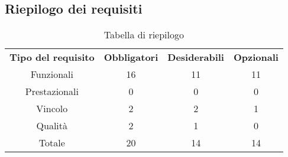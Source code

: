 \subsection{Riepilogo dei requisiti}
\begin{table}[h]
\centering
\begin{tabular}{| c | c | c | c |}
		\rowcolor{LightBlue}
		\color{white}\bfseries Tipo del requisito & \color{white}\bfseries Obbligatori & \color{white}\bfseries Desiderabili & \color{white}\bfseries Opzionali \\[0.25cm]
		 Funzionali & 16 & 11 & 11 \\
		 Prestazionali & 0 & 0 & 0 \\
		 Vincolo & 2 & 2 & 1 \\
		 Qualità & 2 & 1 & 0 \\
		 Totale & 20 & 14 & 14 \\ \hline
\end{tabular}
		\caption{Tabella di riepilogo}
\end{table}